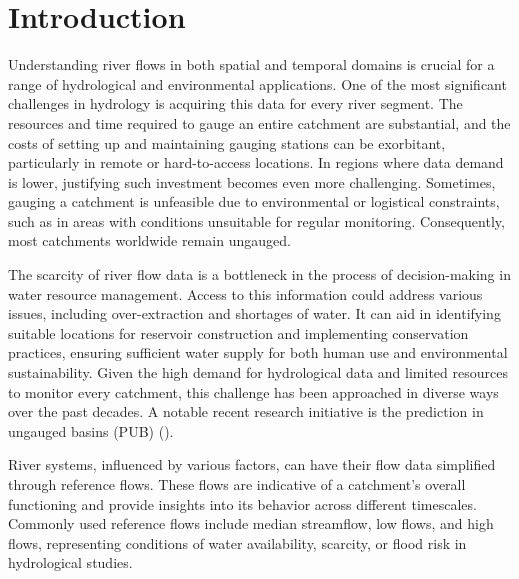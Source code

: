 \documentclass[12pt]{article}
\begin{document}
\listoffigures
\clearpage	

\linenumbers %
	
\section{Introduction} \label{sec:intro}

\par Understanding river flows in both spatial and temporal domains is crucial for a range of hydrological and environmental applications. One of the most significant challenges in hydrology is acquiring this data for every river segment. The resources and time required to gauge an entire catchment are substantial, and the costs of setting up and maintaining gauging stations can be exorbitant, particularly in remote or hard-to-access locations. In regions where data demand is lower, justifying such investment becomes even more challenging. Sometimes, gauging a catchment is unfeasible due to environmental or logistical constraints, such as in areas with conditions unsuitable for regular monitoring. Consequently, most catchments worldwide remain ungauged.

\par The scarcity of river flow data is a bottleneck in the process of decision-making in water resource management. Access to this information could address various issues, including over-extraction and shortages of water. It can aid in identifying suitable locations for reservoir construction and implementing conservation practices, ensuring sufficient water supply for both human use and environmental sustainability. Given the high demand for hydrological data and limited resources to monitor every catchment, this challenge has been approached in diverse ways over the past decades. A notable recent research initiative is the prediction in ungauged basins (PUB) (\cite{bloschl2013, hrachowitz2013}).

\par River systems, influenced by various factors, can have their flow data simplified through reference flows. These flows are indicative of a catchment's overall functioning and provide insights into its behavior across different timescales. Commonly used reference flows include median streamflow, low flows, and high flows, representing conditions of water availability, scarcity, or flood risk in hydrological studies.
\end{document}
